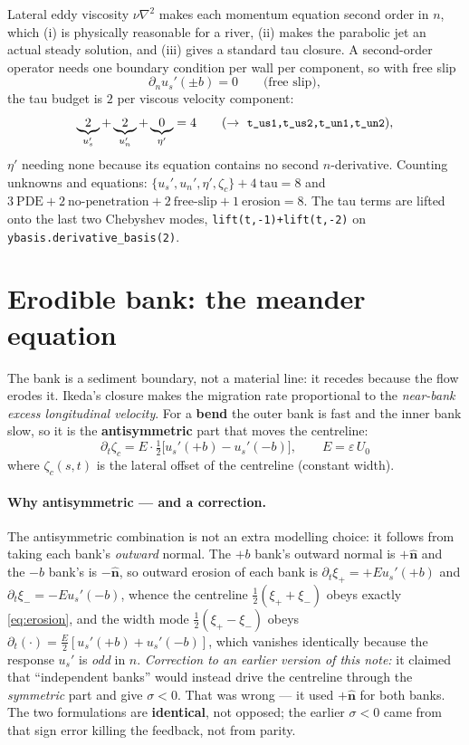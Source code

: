 \documentclass[11pt]{article}
\newcommand{\us}{u_s}
\newcommand{\un}{u_n}
\newcommand{\dn}{\partial_n}
\newcommand{\dt}{\partial_t}
\newcommand{\code}[1]{\texttt{\small #1}}
\begin{document}
Lateral eddy viscosity $\nu\nabla^{2}$ makes each momentum equation second order in
$n$, which (i) is physically reasonable for a river, (ii) makes the parabolic jet an
actual steady solution, and (iii) gives a standard tau closure. A second-order
operator needs one boundary condition per wall per component, so with free slip
\begin{equation}
  \dn\us'(\pm b)=0\qquad\text{(free slip)} ,
\end{equation}
the tau budget is $2$ per viscous velocity component:
\[
  \underbrace{2}_{\us'}+\underbrace{2}_{\un'}+\underbrace{0}_{\eta'}=4
  \qquad(\to\ \code{t\_us1,t\_us2,t\_un1,t\_un2}),
\]
$\eta'$ needing none because its equation contains no second $n$-derivative.
Counting unknowns and equations:
$\{\us',\un',\eta',\zeta_c\}+4\ \text{tau}=8$ and
$3\ \text{PDE}+2\ \text{no-penetration}+2\ \text{free-slip}+1\ \text{erosion}=8$.
The tau terms are lifted onto the last two Chebyshev modes,
\code{lift(t,-1)+lift(t,-2)} on \code{ybasis.derivative\_basis(2)}.

\section{Erodible bank: the meander equation}
\label{sec:erosion}

The bank is a sediment boundary, not a material line: it recedes because the flow
erodes it. Ikeda's closure makes the migration rate proportional to the
\emph{near-bank excess longitudinal velocity}. For a \textbf{bend} the outer bank is
fast and the inner bank slow, so it is the \textbf{antisymmetric} part that moves the
centreline:
\begin{equation}
  \boxed{\;\dt\zeta_c=E\cdot\tfrac12\big[\us'(+b)-\us'(-b)\big],\qquad E=\varepsilon\,U_0\;}
  \label{eq:erosion}
\end{equation}
where $\zeta_c(s,t)$ is the lateral offset of the centreline (constant width).

\paragraph{Why antisymmetric --- and a correction.} The antisymmetric combination is
not an extra modelling choice: it follows from taking each bank's \emph{outward}
normal. The $+b$ bank's outward normal is $+\hat{\bm n}$ and the $-b$ bank's is
$-\hat{\bm n}$, so outward erosion of each bank is
$\dt\xi_+=+E\us'(+b)$ and $\dt\xi_-=-E\us'(-b)$, whence the centreline
$\tfrac12(\xi_++\xi_-)$ obeys exactly \eqref{eq:erosion}, and the width mode
$\tfrac12(\xi_+-\xi_-)$ obeys $\dt(\cdot)=\tfrac{E}{2}[\us'(+b)+\us'(-b)]$, which
vanishes identically because the response $\us'$ is \emph{odd} in $n$.
\emph{Correction to an earlier version of this note:} it claimed that
``independent banks'' would instead drive the centreline through the
\emph{symmetric} part and give $\sigma<0$. That was wrong --- it used $+\hat{\bm n}$
for both banks. The two formulations are \textbf{identical}, not opposed; the
earlier $\sigma<0$ came from that sign error killing the feedback, not from parity.
\end{document}
